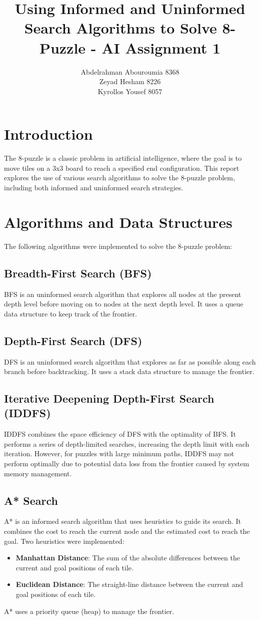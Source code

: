 \documentclass{article}
\title{Using Informed and Uninformed Search Algorithms to Solve 8-Puzzle - AI Assignment 1}
\author{Abdelrahman Abouroumia 8368\\Zeyad Hesham 8226\\Kyrollos Yousef 8057}
\date{}
\begin{document}
\maketitle

\section{Introduction}
The 8-puzzle is a classic problem in artificial intelligence, where the goal is to move tiles on a 3x3 board to reach a specified end configuration. This report explores the use of various search algorithms to solve the 8-puzzle problem, including both informed and uninformed search strategies.

\section{Algorithms and Data Structures}
The following algorithms were implemented to solve the 8-puzzle problem:

\subsection{Breadth-First Search (BFS)}
BFS is an uninformed search algorithm that explores all nodes at the present depth level before moving on to nodes at the next depth level. It uses a queue data structure to keep track of the frontier.

\subsection{Depth-First Search (DFS)}
DFS is an uninformed search algorithm that explores as far as possible along each branch before backtracking. It uses a stack data structure to manage the frontier.

\subsection{Iterative Deepening Depth-First Search (IDDFS)}
IDDFS combines the space efficiency of DFS with the optimality of BFS. It performs a series of depth-limited searches, increasing the depth limit with each iteration. However, for puzzles with large minimum paths, IDDFS may not perform optimally due to potential data loss from the frontier caused by system memory management.

\subsection{A* Search}
A* is an informed search algorithm that uses heuristics to guide its search. It combines the cost to reach the current node and the estimated cost to reach the goal. Two heuristics were implemented:
\begin{itemize}
    \item \textbf{Manhattan Distance}: The sum of the absolute differences between the current and goal positions of each tile.
    \item \textbf{Euclidean Distance}: The straight-line distance between the current and goal positions of each tile.
\end{itemize}
A* uses a priority queue (heap) to manage the frontier.
\end{document}
